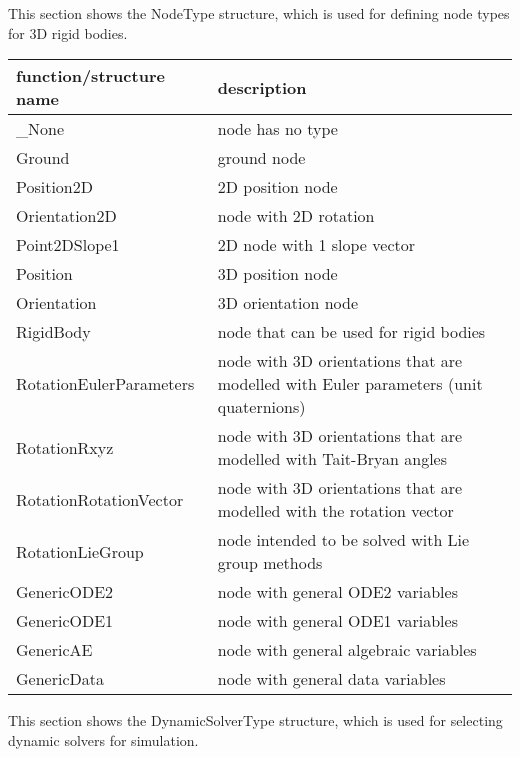 \label{sec:NodeType}
This section shows the NodeType structure, which is used for defining node types for 3D rigid bodies.



\begin{center}
\footnotesize
\begin{longtable}{| p{8cm} | p{8cm} |} 
\hline
{\bf function/structure name} & {\bf description}\\ \hline
  \_None & node has no type\\ \hline 
  Ground & ground node\\ \hline 
  Position2D & 2D position node \\ \hline 
  Orientation2D & node with 2D rotation\\ \hline 
  Point2DSlope1 & 2D node with 1 slope vector\\ \hline 
  Position & 3D position node\\ \hline 
  Orientation & 3D orientation node\\ \hline 
  RigidBody & node that can be used for rigid bodies\\ \hline 
  RotationEulerParameters & node with 3D orientations that are modelled with Euler parameters (unit quaternions)\\ \hline 
  RotationRxyz & node with 3D orientations that are modelled with Tait-Bryan angles\\ \hline 
  RotationRotationVector & node with 3D orientations that are modelled with the rotation vector\\ \hline 
  RotationLieGroup & node intended to be solved with Lie group methods\\ \hline 
  GenericODE2 & node with general ODE2 variables\\ \hline 
  GenericODE1 & node with general ODE1 variables\\ \hline 
  GenericAE & node with general algebraic variables\\ \hline 
  GenericData & node with general data variables\\ \hline 
\end{longtable}
\end{center}

\label{sec:DynamicSolverType}
This section shows the DynamicSolverType structure, which is used for selecting dynamic solvers for simulation.



